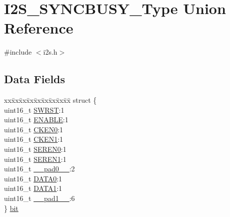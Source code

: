 \hypertarget{union_i2_s___s_y_n_c_b_u_s_y___type}{}\section{I2\+S\+\_\+\+S\+Y\+N\+C\+B\+U\+S\+Y\+\_\+\+Type Union Reference}
\label{union_i2_s___s_y_n_c_b_u_s_y___type}


{\ttfamily \#include $<$i2s.\+h$>$}

\subsection*{Data Fields}
\begin{DoxyCompactItemize}
\item 
\begin{tabbing}
xx\=xx\=xx\=xx\=xx\=xx\=xx\=xx\=xx\=\kill
struct \{\\
\>uint16\_t \mbox{\hyperlink{union_i2_s___s_y_n_c_b_u_s_y___type_a4987fcca11694bd2ffae6a773a9bfc24}{SWRST}}:1\\
\>uint16\_t \mbox{\hyperlink{union_i2_s___s_y_n_c_b_u_s_y___type_aec203800ebef356dc04f3e8986a824d8}{ENABLE}}:1\\
\>uint16\_t \mbox{\hyperlink{union_i2_s___s_y_n_c_b_u_s_y___type_a3c6c761c8c3df227d2f9e7f6f8091890}{CKEN0}}:1\\
\>uint16\_t \mbox{\hyperlink{union_i2_s___s_y_n_c_b_u_s_y___type_af9f91d8e4c8feee4b4b08193330bf325}{CKEN1}}:1\\
\>uint16\_t \mbox{\hyperlink{union_i2_s___s_y_n_c_b_u_s_y___type_a07a8176579e9ec8ddca4dee01c337400}{SEREN0}}:1\\
\>uint16\_t \mbox{\hyperlink{union_i2_s___s_y_n_c_b_u_s_y___type_a12a73e096dbeed2cd039036cd58206e0}{SEREN1}}:1\\
\>uint16\_t \mbox{\hyperlink{union_i2_s___s_y_n_c_b_u_s_y___type_a77132c2c26a75f5b8751b235cda23828}{\_\_pad0\_\_}}:2\\
\>uint16\_t \mbox{\hyperlink{union_i2_s___s_y_n_c_b_u_s_y___type_ae5f7fdde60319a5707f2baa489394ba5}{DATA0}}:1\\
\>uint16\_t \mbox{\hyperlink{union_i2_s___s_y_n_c_b_u_s_y___type_ab597b1fed19427117f7e3e9f6ee42a10}{DATA1}}:1\\
\>uint16\_t \mbox{\hyperlink{union_i2_s___s_y_n_c_b_u_s_y___type_ab72e3a1f2f7db8695c60c658f5a0f11a}{\_\_pad1\_\_}}:6\\
\} \mbox{\hyperlink{union_i2_s___s_y_n_c_b_u_s_y___type_a75c5d493a429f35fa696a4052b253e1f}{bit}}\\


\end{tabbing}
\end{DoxyCompactItemize}
